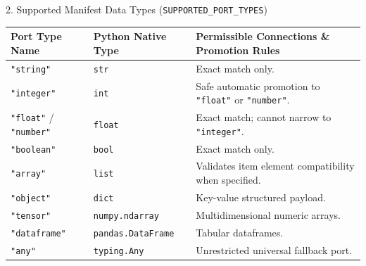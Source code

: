 \documentclass[11pt,a4paper]{article}
\begin{document}
\begin{cheatsheetcard}{2. Supported Manifest Data Types (\texttt{SUPPORTED\_PORT\_TYPES})}
\small
\begin{tabularx}{\linewidth}{p{3.2cm} p{2.8cm} X}
\textbf{Port Type Name} & \textbf{Python Native Type} & \textbf{Permissible Connections \& Promotion Rules} \\
\midrule
\texttt{"string"} & \texttt{str} & Exact match only. \\
\texttt{"integer"} & \texttt{int} & Safe automatic promotion to \texttt{"float"} or \texttt{"number"}. \\
\texttt{"float"} / \texttt{"number"} & \texttt{float} & Exact match; cannot narrow to \texttt{"integer"}. \\
\texttt{"boolean"} & \texttt{bool} & Exact match only. \\
\texttt{"array"} & \texttt{list} & Validates item element compatibility when specified. \\
\texttt{"object"} & \texttt{dict} & Key-value structured payload. \\
\texttt{"tensor"} & \texttt{numpy.ndarray} & Multidimensional numeric arrays. \\
\texttt{"dataframe"} & \texttt{pandas.DataFrame} & Tabular dataframes. \\
\texttt{"any"} & \texttt{typing.Any} & Unrestricted universal fallback port. \\
\end{tabularx}
\end{cheatsheetcard}

\vspace{6pt}
\end{document}
